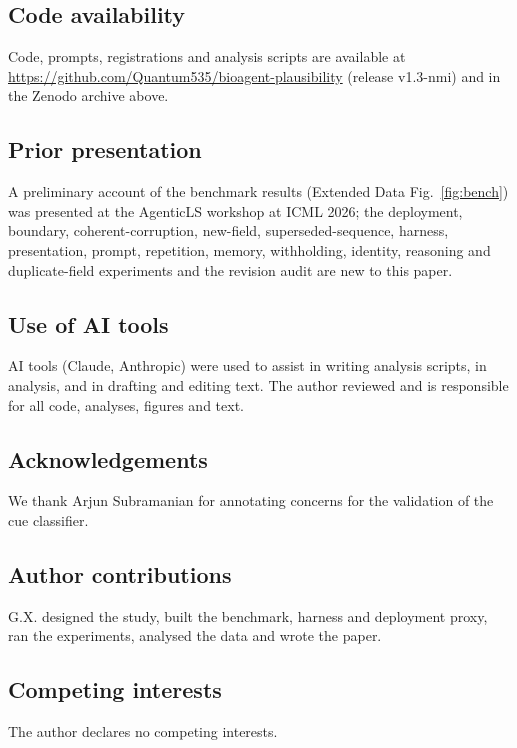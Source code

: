 \subsection*{Code availability}
Code, prompts, registrations and analysis scripts are available at \url{https://github.com/Quantum535/bioagent-plausibility} (release v1.3-nmi) and in the Zenodo archive above.

\subsection*{Prior presentation}
A preliminary account of the benchmark results (Extended Data Fig.~\ref{fig:bench}) was presented at the AgenticLS workshop at ICML 2026; the deployment, boundary, coherent-corruption, new-field, superseded-sequence, harness, presentation, prompt, repetition, memory, withholding, identity, reasoning and duplicate-field experiments and the revision audit are new to this paper.

\subsection*{Use of AI tools}
AI tools (Claude, Anthropic) were used to assist in writing analysis scripts, in analysis, and in drafting and editing text. The author reviewed and is responsible for all code, analyses, figures and text.

\subsection*{Acknowledgements}
We thank Arjun Subramanian for annotating concerns for the validation of the cue classifier.

\subsection*{Author contributions}
G.X. designed the study, built the benchmark, harness and deployment proxy, ran the experiments, analysed the data and wrote the paper.

\subsection*{Competing interests}
The author declares no competing interests.

